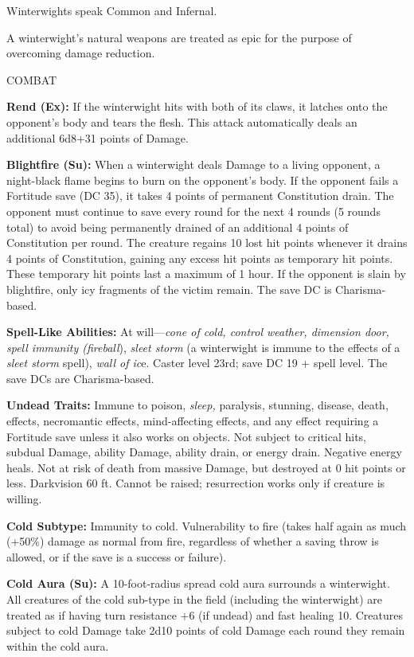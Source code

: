 \documentclass{article}
\begin{document}
{Winterwights speak Common and Infernal. 

A winterwight's natural weapons are treated as epic for the purpose of overcoming 
damage reduction.

COMBAT 

\textbf{Rend (Ex):} If the winterwight hits with both of its claws, it latches 
onto the opponent's body and tears the flesh. This attack automatically deals an 
additional 6d8+31 points of Damage. 

\textbf{Blightfire (Su):} When a winterwight deals Damage to a living opponent, 
a night-black flame begins to burn on the opponent's body. If the opponent fails 
a Fortitude save (DC 35), it takes 4 points of permanent Constitution drain. The 
opponent must continue to save every round for the next 4 rounds (5 rounds total) 
to avoid being permanently drained of an additional 4 points of Constitution per 
round. The creature regains 10 lost hit points whenever it drains 4 points of Constitution, 
gaining any excess hit points as temporary hit points. These temporary hit points 
last a maximum of 1 hour. If the opponent is slain by blightfire, only icy fragments 
of the victim remain. The save DC is Charisma-based.

\textbf{Spell-Like Abilities: }At will---\textit{cone of cold, control weather, 
dimension door, spell immunity (fireball}), \textit{sleet storm }(a winterwight 
is immune to the effects of a \textit{sleet storm }spell), \textit{wall of ic}e. 
Caster level 23rd; save DC 19 + spell level. The save DCs are Charisma-based.

\textbf{Undead Traits:} Immune to poison, \textit{sleep, }paralysis, stunning, 
disease, death, effects, necromantic effects, mind-affecting effects, and any effect 
requiring a Fortitude save unless it also works on objects. Not subject to critical 
hits, subdual Damage, ability Damage, ability drain, or energy drain. Negative 
energy heals. Not at risk of death from massive Damage, but destroyed at 0 hit 
points or less. Darkvision 60 ft. Cannot be raised; resurrection works only if 
creature is willing. 

\textbf{Cold Subtype:} Immunity to cold. Vulnerability to fire (takes half again 
as much (+50\%) damage as normal from fire, regardless of whether a saving throw 
is allowed, or if the save is a success or failure). 

\textbf{Cold Aura (Su):} A 10-foot-radius spread cold aura surrounds a winterwight. 
All creatures of the cold sub-type in the field (including the winterwight) are 
treated as if having turn resistance +6 (if undead) and fast healing 10. Creatures 
subject to cold Damage take 2d10 points of cold Damage each round they remain within 
the cold aura. 

}
\end{document}
